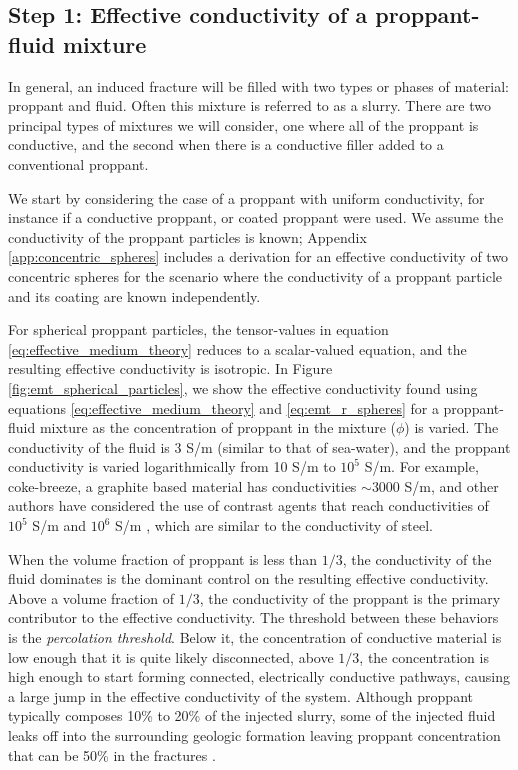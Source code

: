 \subsection{Step 1: Effective conductivity of a proppant-fluid mixture}
In general, an induced fracture will be filled with two types or phases of material: proppant and fluid. Often this mixture is referred to as a slurry. There are two principal types of mixtures we will consider, one where all of the proppant is conductive, and the second when there is a conductive filler added to a conventional proppant.

We start by considering the case of a proppant with uniform conductivity, for instance if a conductive proppant, or coated proppant were used. We assume the conductivity of the proppant particles is known; Appendix \ref{app:concentric_spheres} includes a derivation for an effective conductivity of two concentric spheres for the scenario where the conductivity of a proppant particle and its coating are known independently.

For spherical proppant particles, the tensor-values in equation \ref{eq:effective_medium_theory} reduces to a scalar-valued equation, and the resulting effective conductivity is isotropic. In Figure \ref{fig:emt_spherical_particles}, we show the effective conductivity found using equations \ref{eq:effective_medium_theory} and \ref{eq:emt_r_spheres} for a proppant-fluid mixture as the concentration of proppant in the mixture ($\phi$) is varied. The conductivity of the fluid is 3 S/m (similar to that of sea-water), and the proppant conductivity is varied logarithmically from 10 S/m to $10^5$ S/m. For example, coke-breeze, a graphite based material has conductivities $\sim 3000$ S/m, and other authors have considered the use of contrast agents that reach conductivities of $10^5$ S/m \cite{Weiss2015} and $10^6$ S/m \cite{Pardo2013}, which are similar to the conductivity of steel.




When the volume fraction of proppant is less than $1/3$, the conductivity of the fluid dominates is the dominant control on the resulting effective conductivity. Above a volume  fraction of $1/3$, the conductivity of the proppant is the primary contributor to the effective conductivity. The threshold between these behaviors is the \emph{percolation threshold}. Below it, the concentration of conductive material is low enough that it is quite likely disconnected, above $1/3$, the concentration is high enough to start forming connected, electrically conductive pathways, causing a large jump in the effective conductivity of the system. Although proppant typically composes 10\% to 20\% of the injected slurry, some of the injected fluid leaks off into the surrounding geologic formation leaving proppant concentration that can be 50\% in the fractures \cite{Novotny1977, Hoversten2015}.

